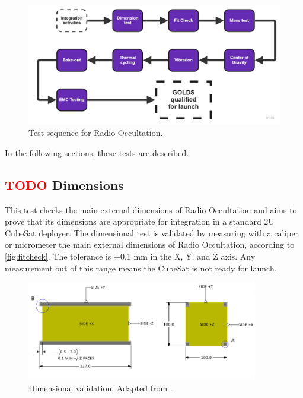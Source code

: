 \begin{figure}[!htb]
    \centering
    \includegraphics[scale=0.3]{figures/tests_chart.pdf}
    \caption{Test sequence for Radio Occultation.}
    \label{fig:testesequency}
\end{figure}

In the following sections, these tests are described.


\subsection{ \textcolor{red}{TODO} Dimensions}

This test checks the main external dimensions of Radio Occultation and aims to prove that its dimensions are appropriate for integration in a standard 2U CubeSat deployer. The dimensional test is validated by measuring with a caliper or micrometer the main external dimensions of Radio Occultation, according to \autoref{fig:fitcheck}. The tolerance is $\pm$0.1 mm in the X, Y, and Z axis. Any measurement out of this range means the CubeSat is not ready for launch.

\begin{figure}[!htb]
    \begin{center}
        \includegraphics[width=0.9\textwidth]{figures/fit_check.png}
        \caption{Dimensional validation. Adapted from \cite{cds}.}
        \label{fig:fitcheck}
    \end{center}
\end{figure}

